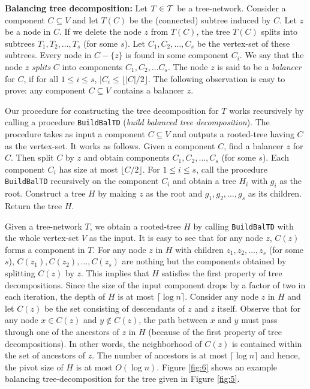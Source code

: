 \documentclass[11pt]{article}
\newcommand{\calT} {{\cal T}}
\newcommand{\BuildBTD} {{\tt BuildBalTD}}
\newcommand{\ceil}[1] {\lceil #1 \rceil}
\newcommand{\floor}[1] {\lfloor #1 \rfloor}
\begin{document}
\noindent
{\bf Balancing tree decomposition: }
Let $T\in \calT$ be a tree-network. Consider a component $C\subseteq V$
and let $T(C)$ be the (connected) subtree induced by $C$.
Let $z$ be a node in $C$. If we delete the node $z$ from $T(C)$,
the tree $T(C)$ splits into subtrees $T_1, T_2, \ldots, T_s$ (for some $s$).
Let $C_1, C_2, \ldots, C_s$ be the vertex-set of these subtrees.
Every node in $C-\{z\}$ is found in some component $C_i$.
We say that the node $z$ {\em splits} $C$ into components $C_1, C_2, \ldots C_s$.
The node $z$ is said to be a {\em balancer} for $C$, if for all $1\leq i\leq s$, $|C_i\leq \floor{|C|/2}$.
The following observation is easy to prove:
any component $C\subseteq V$ contains a balancer $z$.

Our procedure for constructing the tree decomposition for $T$ works recursively
by calling a procedure {\BuildBTD} ({\em build balanced tree decomposition}).
The procedure takes as input a component $C\subseteq V$ and outputs a rooted-tree
having $C$ as the vertex-set. It works as follows.
Given a component $C$, find a balancer $z$ for $C$.
Then split $C$ by $z$ and obtain components $C_1, C_2, \ldots, C_s$ (for some $s$).
Each component $C_i$ has size at most $\floor{C/2}$.
For $1\leq i\leq s$, call the procedure {\BuildBTD} recursively on the component $C_i$
and obtain a tree $H_i$ with $g_i$ as the root. Construct a tree $H$ by making $z$ as the root
and $g_1, g_2, \ldots, g_s$ as its children. Return the tree $H$.

Given a tree-network $T$, we obtain a rooted-tree $H$ by calling {\BuildBTD} with the whole
vertex-set $V$ as the input. 
It is easy to see that for any node $z$, $C(z)$ forms a component in $T$.
For any node $z$ in $H$ with children $z_1, z_2, \ldots, z_s$ (for some $s$),
$C(z_1), C(z_2), \ldots, C(z_s)$ are nothing but the components obtained by splitting $C(z)$ by $z$.
This implies that $H$ satisfies the first property of tree decompositions.
Since the size of the input component drops by a factor of two in each iteration,
the depth of $H$ is at most $\ceil{\log n}$.
Consider any node $z$ in $H$ and let $C(z)$ be the set consisting of descendants of $z$ and $z$ itself.
Observe that for any node $x\in C(z)$ and $y\not\in C(z)$, the path between $x$ and $y$
must pass through one of the ancestors of $z$ in $H$ (because of the first property of tree decompositions).
In other words, the neighborhood of $C(z)$ is contained within the set of ancestors of $z$.
The number of ancestors is at most $\ceil{\log n}$ and
hence, the pivot size of $H$ is at most $O(\log n)$.
Figure \ref{fig:6} shows an example balancing tree-decomposition for the tree given in Figure \ref{fig:5}.
\end{document}
